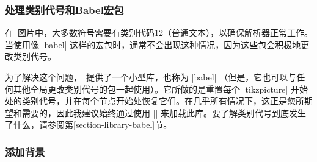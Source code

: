 \subsubsection{处理类别代号和Babel宏包}


在\tikzname\ 图片中，大多数符号需要有类别代码12（普通文本），以确保解析器正常工作。当使用像 |babel| 这样的宏包时，通常不会出现这种情况，因为这些包会积极地更改类别代号。


为了解决这个问题，\tikzname\ 提供了一个小型库，也称为 |babel| （但是，它也可以与任何其他全局更改类别代号的包一起使用）。它所做的是重置每个 |{tikzpicture}| 开始处的类别代号，并在每个节点开始处恢复它们。在几乎所有情况下，这正是您所期望和需要的，因此我建议始终通过使用 |\usetikzlibrary{babel}| 来加载此库。要了解类别代号到底发生了什么，请参阅第\ref{section-library-babel}节。


\subsubsection{添加背景}


